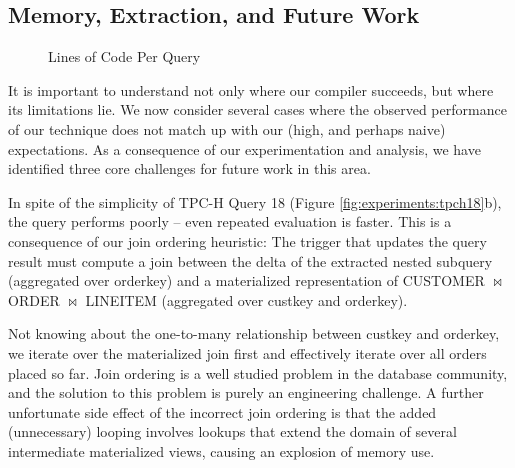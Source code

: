 
\subsection{Memory, Extraction, and Future Work}
\label{sec:experiments:future}

\begin{figure}
\begin{center}

\caption{Lines of Code Per Query}
\label{fig:experiments:loc}
\end{center}
\vspace*{-0.2in}
\end{figure}

It is important to understand not only where our compiler succeeds, but where its limitations lie.  We now consider several cases where the observed performance of our technique does not match up with our (high, and perhaps naive) expectations.  As a consequence of our experimentation and analysis, we have identified three core challenges for future work in this area.

In spite of the simplicity of TPC-H Query 18 (Figure \ref{fig:experiments:tpch18}b), the query performs poorly -- even repeated evaluation is faster.  This is a consequence of our join ordering heuristic: The trigger that updates the query result must compute a join between the delta of the extracted nested subquery (aggregated over orderkey) and a materialized representation of CUSTOMER $\bowtie$ ORDER $\bowtie$ LINEITEM (aggregated over custkey and orderkey).  

Not knowing about the one-to-many relationship between custkey and orderkey, we iterate over the materialized join first and effectively iterate over all orders placed so far.  Join ordering is a well studied problem in the database community, and the solution to this problem is purely an engineering challenge.  A further unfortunate side effect of the incorrect join ordering is that the added (unnecessary) looping involves lookups that extend the domain of several intermediate materialized views, causing an explosion of memory use.


